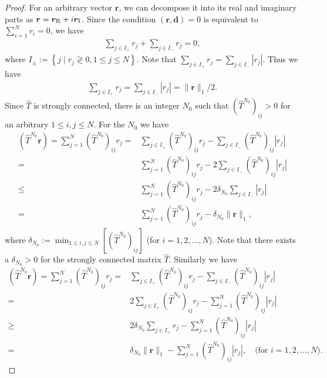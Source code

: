 \begin{proof}
	For an arbitrary vector $\bm{r}$, we can decompose it into its real and imaginary parts as $\bm{r}=\bm{r}_{\rm R} + i\bm{r}_{\rm I}$. Since the condition $(\bm{r},\bm{d}) = 0$ is equivalent to $\sum_{i=1}^{N}r_{i} = 0$, we have
	\begin{align}
	\sum_{j\in I_{+}}r_{j} + \sum_{j\in I_{-}}r_{j} = 0,
	\end{align}
	where $I_{\pm}:=\left\{j\mid r_{j}\gtrless 0,1\leq j\leq N\right\}$. Note that $\sum_{j\in I_{+}}r_{j} = \sum_{j\in I_{-}}|r_{j}|$.  Thus we have
	\begin{align}
	\sum_{j\in I_{+}}r_{j} = \sum_{j\in I_{-}}|r_{j}| = \|\bm{r}\|_{1} / 2.
	\end{align}
	Since $\hat{T}$ is strongly connected, there is an integer $N_{0}$ such that $\left(\hat{T}^{N_{0}}\right)_{ij}>0$ for an arbitrary $1\leq i,j\leq N$. For the $N_{0}$ we have
	\begin{align}
	\left(\hat{T}^{N_{0}}\bm{r}\right) = \sum_{j=1}^{N}\left(\hat{T}^{N_{0}}\right)_{ij}r_{j} =& \sum_{j\in I_{+}}\left(\hat{T}^{N_{0}}\right)_{ij}r_{j} - \sum_{j\in I_{-}}\left(\hat{T}^{N_{0}}\right)_{ij}|r_{j}|\\
	=& \sum_{j=1}^{N}\left(\hat{T}^{N_{0}}\right)_{ij}r_{j} - 2\sum_{j\in I_{-}}\left(\hat{T}^{N_{0}}\right)_{ij}|r_{j}|\\
	\leq& \sum_{j=1}^{N}\left(\hat{T}^{N_{0}}\right)_{ij}r_{j} - 2\delta_{N_{0}}\sum_{j\in I_{-}}|r_{j}|\\
	=& \sum_{j=1}^{N}\left(\hat{T}^{N_{0}}\right)_{ij}r_{j} - \delta_{N_{0}}\|\bm{r}\|_{1},
	\end{align}
	where $\displaystyle\delta_{N_{0}}:= \min_{1\leq i,j\leq N}\left[\left(\hat{T}^{N_{0}}\right)_{ij}\right]$ (for $i=1,2,\dots,N$). Note that there exists a $\delta_{N_{0}} > 0$ for the strongly connected matrix   $\hat{T}$. Similarly we have
	\begin{align}
	\left(\hat{T}^{N_{0}}\bm{r}\right) = \sum_{j=1}^{N}\left(\hat{T}^{N_{0}}\right)_{ij}r_{j} =& \sum_{j\in I_{+}}\left(\hat{T}^{N_{0}}\right)_{ij}r_{j} - \sum_{j\in I_{-}}\left(\hat{T}^{N_{0}}\right)_{ij}|r_{j}|\\
	=& 2\sum_{j\in I_{+}}\left(\hat{T}^{N_{0}}\right)_{ij}r_{j} - \sum_{j=1}^{N}\left(\hat{T}^{N_{0}}\right)_{ij}|r_{j}|\\
	\geq& 2\delta_{N_{0}}\sum_{j\in I_{+}}r_{j} - \sum_{j=1}^{N}\left(\hat{T}^{N_{0}}\right)_{ij}|r_{j}|\\
	=& \delta_{N_{0}}\|\bm{r}\|_{1} - \sum_{j=1}^{N}\left(\hat{T}^{N_{0}}\right)_{ij}|r_{j}|,\quad\text{(for $i=1,2,\dots,N$)}.

\end{align}
\end{proof}
